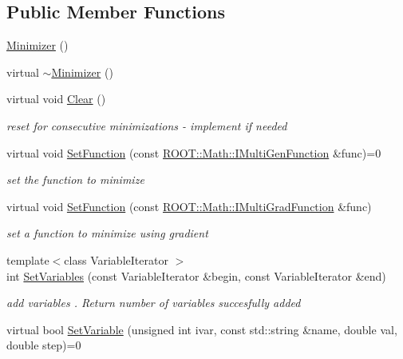 \subsection*{Public Member Functions}
\begin{DoxyCompactItemize}
\item 
\mbox{\hyperlink{classROOT_1_1Math_1_1Minimizer_a6981643dac29da36280b24d32b6d3140}{Minimizer}} ()
\item 
virtual \mbox{\hyperlink{classROOT_1_1Math_1_1Minimizer_aa1045455fe657956659bfa7a21ce447e}{$\sim$\+Minimizer}} ()
\item 
virtual void \mbox{\hyperlink{classROOT_1_1Math_1_1Minimizer_ad7308846baecf68fb0dbc2d5e4caa178}{Clear}} ()
\begin{DoxyCompactList}\small\item\em reset for consecutive minimizations -\/ implement if needed \end{DoxyCompactList}\item 
virtual void \mbox{\hyperlink{classROOT_1_1Math_1_1Minimizer_a4391c613ab0c3f9777e56b487ffa5eac}{Set\+Function}} (const \mbox{\hyperlink{namespaceROOT_1_1Math_aec22897f3d759f7c284893c81d980799}{R\+O\+O\+T\+::\+Math\+::\+I\+Multi\+Gen\+Function}} \&func)=0
\begin{DoxyCompactList}\small\item\em set the function to minimize \end{DoxyCompactList}\item 
virtual void \mbox{\hyperlink{classROOT_1_1Math_1_1Minimizer_a1d9ff15aa732e518a60a05dcbd82c34a}{Set\+Function}} (const \mbox{\hyperlink{namespaceROOT_1_1Math_a014e019aaf9304a00e9231bd9ed232fb}{R\+O\+O\+T\+::\+Math\+::\+I\+Multi\+Grad\+Function}} \&func)
\begin{DoxyCompactList}\small\item\em set a function to minimize using gradient \end{DoxyCompactList}\item 
{\footnotesize template$<$class Variable\+Iterator $>$ }\\int \mbox{\hyperlink{classROOT_1_1Math_1_1Minimizer_a314040274ee907fba52726275a28c9f7}{Set\+Variables}} (const Variable\+Iterator \&begin, const Variable\+Iterator \&end)
\begin{DoxyCompactList}\small\item\em add variables . Return number of variables succesfully added \end{DoxyCompactList}\item 
virtual bool \mbox{\hyperlink{classROOT_1_1Math_1_1Minimizer_a8661a2ac86372602f32f97b3d9262421}{Set\+Variable}} (unsigned int ivar, const std\+::string \&name, double val, double step)=0

\end{DoxyCompactItemize}
